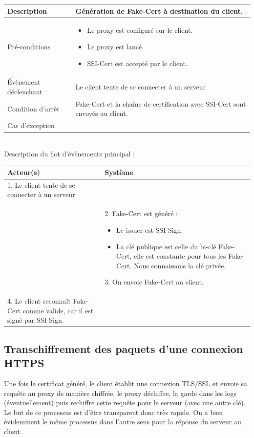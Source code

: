 \documentclass[a4paper,11pt,french]{article}
\begin{document}
\begin{tabular}{|>{\columncolor[gray]{.8}}m{4cm}|m{12cm}|}
   \hline
   Description & Génération de Fake-Cert à destination du client. \\
   \hline
   Pré-conditions & \begin{itemize}
\item Le proxy est configuré sur le client.
\item Le proxy est lancé.
\item SSI-Cert est accepté par le client.
   \end{itemize}
 \\
   \hline
   Évènement déclenchant & Le client tente de se connecter à un serveur \\
   \hline
   Condition d'arrêt &  Fake-Cert et la chaîne de certification avec SSI-Cert sont envoyés au client. \\
   \hline
   Cas d'exception  &
\\
   \hline   
\end{tabular}

~\\

Description du flot d'évènements principal :

\begin{tabular}{|m{8cm}|m{8cm}|}
   \hline
  \rowcolor[gray]{.8} Acteur(s) & Système \\
   \hline
   1. Le client tente de se connecter à un serveur & \\
   \hline
    & 
2. Fake-Cert est généré :
\begin{itemize}
\item Le issuer est SSI-Sign.
\item La clé publique est celle du bi-clé Fake-Cert, elle est constante pour tous les Fake-Cert. Nous connaissons la clé privée.
\end{itemize}
3. On envoie Fake-Cert au client. \\
   \hline
   4. Le client reconnaît Fake-Cert comme valide, car il est signé par SSI-Sign. &  \\
   \hline
\end{tabular}

\subsection{Transchiffrement des paquets d'une connexion HTTPS}

Une fois le certificat généré, le client établit une connexion TLS/SSL et envoie sa requête au proxy de manière chiffrée, le proxy déchiffre, la garde dans les logs (éventuellement) puis rechiffre cette requête pour le serveur (avec une autre clé). Le but de ce processus est d'être transparent donc très rapide.
On a bien évidemment le même processus dans l'autre sens pour la réponse du serveur au client.
\end{document}
